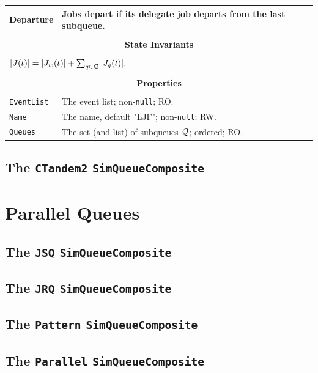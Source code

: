 \documentclass[12pt]{book}
\begin{document}
\begin{tabular}{|l|l|}
\hline
Departure & Jobs depart if its delegate job departs from the last subqueue. \\
\hline
\multicolumn{2}{|c|}{} \\
\multicolumn{2}{|c|}{\bf State  Invariants} \\
\multicolumn{2}{|c|}{} \\
\hline
\multicolumn{2}{|l|}{$|J(t)| = |J_{w}(t)| + \sum_{q \in \cal{Q}} |J_{q}(t)|.$} \\
\hline
\multicolumn{2}{|c|}{} \\
\multicolumn{2}{|c|}{\bf Properties} \\
\multicolumn{2}{|c|}{} \\
\hline
\lstinline|EventList|  & The event list; non-\lstinline|null|; RO. \\
\hline
\lstinline|Name|       & The name, default "LJF"; non-\lstinline|null|; RW. \\
\hline
\lstinline|Queues|     & The set (and list) of subqueues $\cal{Q}$; ordered; RO. \\
\hline
\end{tabular}


\subsection{The \lstinline{CTandem2} \lstinline{SimQueueComposite}}
\label{sec:CTandem2}

\section{Parallel Queues}

\subsection{The \lstinline{JSQ} \lstinline{SimQueueComposite}}
\label{sec:JSQ}

\subsection{The \lstinline{JRQ} \lstinline{SimQueueComposite}}
\label{sec:JRQ}

\subsection{The \lstinline{Pattern} \lstinline{SimQueueComposite}}
\label{sec:Pattern}

\subsection{The \lstinline{Parallel} \lstinline{SimQueueComposite}}
\label{sec:Parallel}
\end{document}

